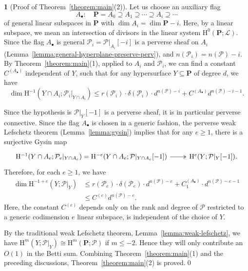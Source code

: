 \documentclass[english]{smfart}
\renewcommand{\mathbb}{\mathbf}
\renewcommand{\leq}{\leqslant}
\renewcommand{\geq}{\geqslant}
\renewcommand{\subset}{\subseteq}
\renewcommand{\supset}{\supseteq}
\theoremstyle{remark}
\theoremstyle{plain}
\theoremstyle{definition}
\numberwithin{equation}{remark}
\theoremstyle{void}
\newtheorem{situation}[remark]{}
\begin{document}
\begin{situation}[Proof of Theorem~\ref{theorem:main}(2)]
\label{situation:proof-2}
Let us choose an auxiliary flag
\[
A_{\bullet}: \quad
\mathbb{P} = A_0 \supset A_1 \supset \cdots \supset A_i \supset \cdots
\]
of general linear subspaces in \(\mathbb{P}\) with
\(\dim A_i = \dim \mathbb{P} - i\).  Here, by a linear subspace, we
mean an intersection of divisors in the linear system
\(\mathrm{H}^0(\mathbb{P}; \mathscr{L})\).  Since the flag
\(A_{\bullet}\) is general
\(\mathcal{P}_i = \mathcal{P}|_{A_{i}}[-i]\) is a perverse sheaf on
\(A_i\) (Lemma~\ref{lemma:general-hyperplane-preserve-perv}), and
\(n(\mathcal{P}_i) = n(\mathcal{P}) - i\).  By
Theorem~\ref{theorem:main}(1), applied to \(A_{i}\) and
\(\mathcal{P}_i\), we can find a constant \(C^{(A_{\bullet})}\) independent of
\(Y\), such that for any hypersurface \(Y \subset \mathbb{P}\) of
degree \(d\), we have
\[
\dim \mathrm{H}^{-1}(Y \cap A_{i}; \mathcal{P}_i|_{Y\cap A_{i}}) \leq r(\mathcal{P}_i)
\cdot \delta(\mathcal{P}_i) \cdot d^{n(\mathcal{P}) - i} + C^{(A_{\bullet})}
d^{n(\mathcal{P}) - i - 1}.
\]

Since the hypothesis is \(\mathcal{P}|_Y[-1]\) is a perverse sheaf, it
is in particular perverse connective.  Since the flag \(A_{\bullet}\)
is chosen in a generic fashion, the perverse weak Lefschetz theorem
(Lemma~\ref{lemma:gysin}) implies that for any \(e\geq 1\), there is a
surjective Gysin map
\[
\begin{tikzcd}
\mathrm{H}^{-1}(Y\cap A_e; \mathcal{P}_e|_{Y\cap A_e})= \mathrm{H}^{-e}(Y\cap A_e; \mathcal{P}|_{Y\cap A_{e}}[-1]) \ar[r,two heads] & \mathrm{H}^{e}(Y; \mathcal{P}|_Y[-1]).
\end{tikzcd}
\]
Therefore, for each \(e\geq 1\), we have
\begin{align*}
  \dim \mathrm{H}^{-1+e}(Y;\mathcal{P}|_Y)
  &\leq r(\mathcal{P}_e) \cdot \delta(\mathcal{P}_e) \cdot d^{n(\mathcal{P}) - e} + C_1^{(A_{\bullet})} \cdot d^{n(\mathcal{P})-e-1} \\
  & \leq C^{(e)} d^{n(\mathcal{P}) - e}.
\end{align*}
Here, the constant \(C^{(e)}\) depends only on the rank and degree of
\(\mathcal{P}\) restricted to a generic codimension \(e\) linear
subspace, is independent of the choice of \(Y\).

By the traditional weak Lefschetz theorem,
Lemma~\ref{lemma:weak-lefschetz}, we have
\(\mathrm{H}^m(Y;\mathcal{P}|_Y)\cong\mathrm{H}^m(\mathbb{P};\mathcal{P})\)
if \(m \leq -2\).  Hence they will only contribute an \(O(1)\) in the
Betti sum.  Combining Theorem~\ref{theorem:main}(1) and the preceding
discussions, Theorem~\ref{theorem:main}(2) is proved.\qed
\end{situation}
\end{document}

